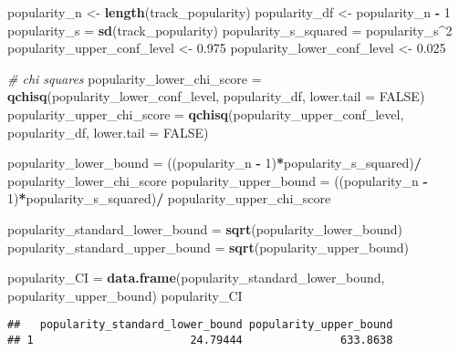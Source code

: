 \documentclass[
]{article}
\newenvironment{Shaded}{\begin{snugshade}}{\end{snugshade}}
\newcommand{\CommentTok}[1]{\textcolor[rgb]{0.56,0.35,0.01}{\textit{#1}}}
\newcommand{\DataTypeTok}[1]{\textcolor[rgb]{0.13,0.29,0.53}{#1}}
\newcommand{\DecValTok}[1]{\textcolor[rgb]{0.00,0.00,0.81}{#1}}
\newcommand{\FloatTok}[1]{\textcolor[rgb]{0.00,0.00,0.81}{#1}}
\newcommand{\KeywordTok}[1]{\textcolor[rgb]{0.13,0.29,0.53}{\textbf{#1}}}
\newcommand{\NormalTok}[1]{#1}
\newcommand{\OperatorTok}[1]{\textcolor[rgb]{0.81,0.36,0.00}{\textbf{#1}}}
\newcommand{\OtherTok}[1]{\textcolor[rgb]{0.56,0.35,0.01}{#1}}
\newcommand{\StringTok}[1]{\textcolor[rgb]{0.31,0.60,0.02}{#1}}
\begin{document}
\begin{Shaded}
\begin{Highlighting}[]
\NormalTok{popularity_n <-}\StringTok{ }\KeywordTok{length}\NormalTok{(track_popularity)}
\NormalTok{popularity_df <-}\StringTok{ }\NormalTok{popularity_n }\OperatorTok{-}\StringTok{ }\DecValTok{1}
\NormalTok{popularity_s =}\StringTok{ }\KeywordTok{sd}\NormalTok{(track_popularity)}
\NormalTok{popularity_s_squared =}\StringTok{ }\NormalTok{popularity_s}\OperatorTok{^}\DecValTok{2} 
\NormalTok{popularity_upper_conf_level <-}\StringTok{ }\FloatTok{0.975}
\NormalTok{popularity_lower_conf_level <-}\StringTok{ }\FloatTok{0.025}

\CommentTok{# chi squares}
\NormalTok{popularity_lower_chi_score =}\StringTok{ }\KeywordTok{qchisq}\NormalTok{(popularity_lower_conf_level, }
\NormalTok{                                    popularity_df, }\DataTypeTok{lower.tail =} \OtherTok{FALSE}\NormalTok{)}
\NormalTok{popularity_upper_chi_score =}\StringTok{ }\KeywordTok{qchisq}\NormalTok{(popularity_upper_conf_level, }
\NormalTok{                                    popularity_df, }\DataTypeTok{lower.tail =} \OtherTok{FALSE}\NormalTok{)}

\NormalTok{popularity_lower_bound =}\StringTok{ }\NormalTok{((popularity_n }\OperatorTok{-}\StringTok{ }\DecValTok{1}\NormalTok{)}\OperatorTok{*}\NormalTok{popularity_s_squared)}\OperatorTok{/}
\StringTok{  }\NormalTok{popularity_lower_chi_score}
\NormalTok{popularity_upper_bound =}\StringTok{ }\NormalTok{((popularity_n }\OperatorTok{-}\StringTok{ }\DecValTok{1}\NormalTok{)}\OperatorTok{*}\NormalTok{popularity_s_squared)}\OperatorTok{/}
\StringTok{  }\NormalTok{popularity_upper_chi_score}

\NormalTok{popularity_standard_lower_bound =}\StringTok{ }\KeywordTok{sqrt}\NormalTok{(popularity_lower_bound)}
\NormalTok{popularity_standard_upper_bound =}\StringTok{ }\KeywordTok{sqrt}\NormalTok{(popularity_upper_bound)}

\NormalTok{popularity_CI =}\StringTok{ }\KeywordTok{data.frame}\NormalTok{(popularity_standard_lower_bound, }
\NormalTok{                           popularity_upper_bound)}
\NormalTok{popularity_CI}
\end{Highlighting}
\end{Shaded}

\begin{verbatim}
##   popularity_standard_lower_bound popularity_upper_bound
## 1                        24.79444               633.8638
\end{verbatim}
\end{document}
